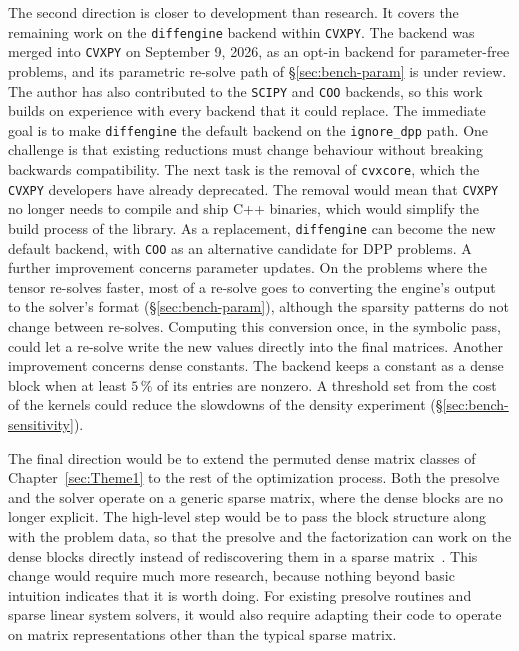The second direction is closer to development than research. It covers the remaining work
on the \texttt{diffengine} backend within
\texttt{CVXPY}. The backend was merged into \texttt{CVXPY} on September 9, 2026, as an opt-in
backend for parameter-free problems, and its parametric re-solve path of \S\ref{sec:bench-param}
is under review. The author has also contributed to the \texttt{SCIPY} and \texttt{COO}
backends, so this work builds on experience with every backend that it could replace. The
immediate goal is to make \texttt{diffengine} the default backend on the
\texttt{ignore\_dpp} path. One challenge is that existing reductions must change behaviour
without breaking backwards compatibility. The next task is the removal of
\texttt{cvxcore}, which the \texttt{CVXPY} developers have already deprecated. The removal
would mean that \texttt{CVXPY} no longer needs to compile and ship C++ binaries, which
would simplify the build process of the library. As a replacement, \texttt{diffengine} can
become the new default backend, with \texttt{COO} as an alternative candidate for \ac{DPP}
problems. A further improvement concerns parameter updates. On the problems where the tensor
re-solves faster, most of a re-solve goes to converting the engine's output to the solver's
format (\S\ref{sec:bench-param}), although the sparsity patterns do not change between
re-solves. Computing this conversion once, in the symbolic pass, could let a re-solve write
the new values directly into the final matrices. Another improvement concerns
dense constants. The backend keeps a constant as a dense block when at least $5\,\%$ of its
entries are nonzero. A threshold set from the cost of the kernels could reduce the slowdowns of
the density experiment (\S\ref{sec:bench-sensitivity}).

The final direction would be to extend the permuted dense matrix classes of
Chapter~\ref{sec:Theme1} to the rest of the
optimization process. Both the presolve and the solver operate on a generic sparse matrix,
where the dense blocks are no longer explicit. The high-level step would be to pass the
block structure along with the problem data, so that the presolve and the factorization can
work on the dense blocks directly instead of rediscovering them in a sparse
matrix~\cite{davis2006direct}. This change would require much
more research, because nothing beyond basic intuition indicates that it is worth doing.
For existing presolve
routines and sparse linear system solvers, it would also require adapting their code to
operate on matrix representations other than the typical sparse matrix.
